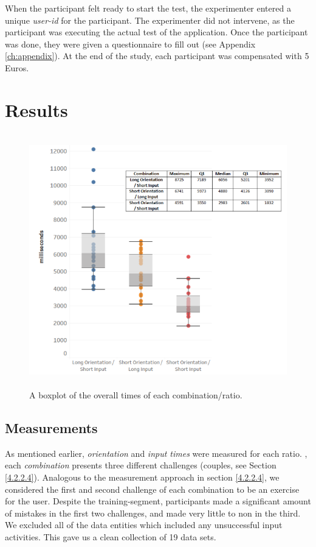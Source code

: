 When the participant felt ready to start the test, the experimenter entered a unique \textit{user-id} for the participant. The experimenter did not intervene, as the participant was executing the actual test of the application. Once the participant was done, they were given a questionnaire to fill out (see Appendix \ref{ch:appendix}). At the end of the study, each participant was compensated with 5 Euros.

\section{Results} \label{5.4}

\begin{figure}[t!]
\centering
\includegraphics[width=13cm, height=11cm]{Chapters/graphics/Combinations.png}
\caption{A boxplot of the overall times of each combination/ratio.}
\label{fig:combination}
\end{figure}

\subsection{Measurements}

 As mentioned earlier, \textit{orientation} and \textit{input times} were measured for each ratio. , each \textit{combination} presents three different challenges (couples, see Section \ref{4.2.2.4}). Analogous to the measurement approach in section \ref{4.2.2.4}, we considered the first and second challenge of each combination to be an exercise for the user. Despite the training-segment, participants made a significant amount of mistakes in the first two challenges, and made very little to non in the third. We excluded all of the data entities which included any unsuccessful input activities. This gave us a clean collection of 19 data sets. \\

